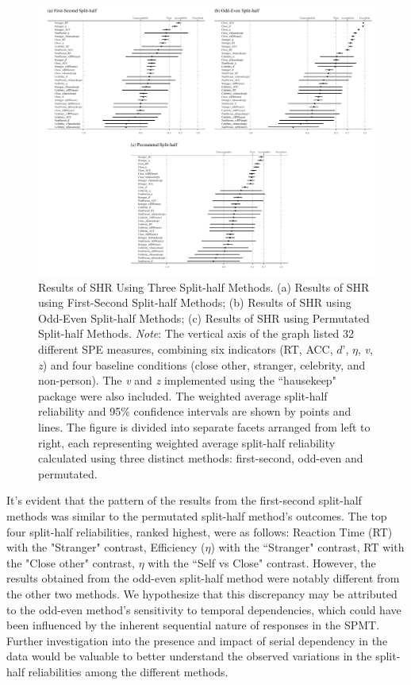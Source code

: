 \documentclass[sn-apa]{sn-jnl}%
\theoremstyle{thmstyleone}%
\theoremstyle{thmstyletwo}%
\theoremstyle{thmstylethree}%
\begin{document}
\begin{figure}[ht]
	\centering
	\includegraphics[width=1\textwidth]{./Figure/Fig3_SHR.png}
	\caption[Results of SHR Using Three Split-half Methods]{Results of SHR Using Three Split-half Methods. (a) Results of SHR using First-Second Split-half Methods; (b) Results of SHR using Odd-Even Split-half Methods; (c) Results of SHR using Permutated Split-half Methods.  \textit{Note}: The vertical axis of the graph listed 32 different SPE measures, combining six indicators (RT, ACC, $d’$, $\eta$, \textit{v}, \textit{z}) and four baseline conditions (close other, stranger, celebrity, and non-person). The \textit{v} and \textit{z} implemented using the ``hausekeep" package were also included. The weighted average split-half reliability and 95\% confidence intervals are shown by points and lines. The figure is divided into separate facets arranged from left to right, each representing weighted average split-half reliability calculated using three distinct methods: first-second, odd-even and permutated. 
	}\label{fig:SHR_Result}
\end{figure}


It's evident that the pattern of the results from the first-second split-half methods was similar to the permutated split-half method's outcomes. The top four split-half reliabilities, ranked highest, were as follows: Reaction Time (RT) with the "Stranger" contrast, Efficiency ($\eta$) with the ``Stranger" contrast, RT with the "Close other" contrast, $\eta$ with the ``Self vs Close" contrast. However, the results obtained from the odd-even split-half method were notably different from the other two methods. We hypothesize that this discrepancy may be attributed to the odd-even method's sensitivity to temporal dependencies, which could have been influenced by the inherent sequential nature of responses in the SPMT. Further investigation into the presence and impact of serial dependency in the data would be valuable to better understand the observed variations in the split-half reliabilities among the different methods.
\end{document}
